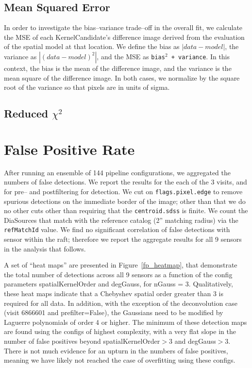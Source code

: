 \documentclass[prd, nofootinbib, floatfix, 11pt,tightenlines,times]{article}
\begin{document}
\subsection{Mean Squared Error}

In order to investigate the bias--variance trade--off in the overall
fit, we calculate the MSE of each KernelCandidate's difference image
derived from the evaluation of the spatial model at that location.  We
define the bias as $\left| data - model \right|$, the variance as
$\left| (data - model)^2 \right|$, and the MSE as {\tt bias$^2$ +
  variance}.  In this context, the bias is the mean of the difference
image, and the variance is the mean square of the difference image.
In both cases, we normalize by the square root of the variance so that
pixels are in units of sigma.

\subsection{Reduced $\chi^2$}

\section{False Positive Rate}

After running an ensemble of 144 pipeline configurations, we
aggregated the numbers of false detections.  We report the results for
the each of the 3 visits, and for pre-- and postfiltering for
detection.  We cut on {\tt flags.pixel.edge} to remove spurious
detections on the immediate border of the image; other than that we do
no other cuts other than requiring that the {\tt centroid.sdss} is
finite.  We count the DiaSources that match with the reference catalog
(2'' matching radius) via the {\tt refMatchId} value.  We find no
significant correlation of false detections with sensor within the
raft; therefore we report the aggregate results for all 9 sensors in
the analysis that follows.

A set of ``heat maps'' are presented in Figure~\ref{fp_heatmap}, that
demonstrate the total number of detections across all 9 sensors as a
function of the config parameters spatialKernelOrder and degGauss, for
nGauss = 3.  Qualitatively, these heat maps indicate that a Chebyshev
spatial order greater than 3 is required for all data.  In addition,
with the exception of the deconvolution case (visit 6866601 and
prefilter=False), the Gaussians need to be modified by Laguerre
polynomials of order 4 or higher.  The minimum of these detection maps
are found using the configs of highest complexity, with a very flat
slope in the number of false positives beyond spatialKernelOrder$>$3
and degGauss$>$3.  There is not much evidence for an upturn in the
numbers of false positives, meaning we have likely not reached the
case of overfitting using these configs.
\end{document}

